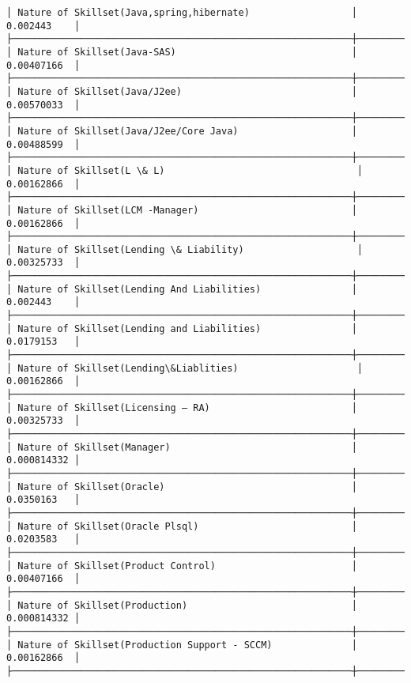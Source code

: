 \documentclass[11pt]{article}
\begin{document}
\begin{Verbatim}[commandchars=\\\{\}]
│ Nature of Skillset(Java,spring,hibernate)                  │ 0.002443    │
├────────────────────────────────────────────────────────────┼─────────────┤
│ Nature of Skillset(Java-SAS)                               │ 0.00407166  │
├────────────────────────────────────────────────────────────┼─────────────┤
│ Nature of Skillset(Java/J2ee)                              │ 0.00570033  │
├────────────────────────────────────────────────────────────┼─────────────┤
│ Nature of Skillset(Java/J2ee/Core Java)                    │ 0.00488599  │
├────────────────────────────────────────────────────────────┼─────────────┤
│ Nature of Skillset(L \& L)                                  │ 0.00162866  │
├────────────────────────────────────────────────────────────┼─────────────┤
│ Nature of Skillset(LCM -Manager)                           │ 0.00162866  │
├────────────────────────────────────────────────────────────┼─────────────┤
│ Nature of Skillset(Lending \& Liability)                    │ 0.00325733  │
├────────────────────────────────────────────────────────────┼─────────────┤
│ Nature of Skillset(Lending And Liabilities)                │ 0.002443    │
├────────────────────────────────────────────────────────────┼─────────────┤
│ Nature of Skillset(Lending and Liabilities)                │ 0.0179153   │
├────────────────────────────────────────────────────────────┼─────────────┤
│ Nature of Skillset(Lending\&Liablities)                     │ 0.00162866  │
├────────────────────────────────────────────────────────────┼─────────────┤
│ Nature of Skillset(Licensing – RA)                         │ 0.00325733  │
├────────────────────────────────────────────────────────────┼─────────────┤
│ Nature of Skillset(Manager)                                │ 0.000814332 │
├────────────────────────────────────────────────────────────┼─────────────┤
│ Nature of Skillset(Oracle)                                 │ 0.0350163   │
├────────────────────────────────────────────────────────────┼─────────────┤
│ Nature of Skillset(Oracle Plsql)                           │ 0.0203583   │
├────────────────────────────────────────────────────────────┼─────────────┤
│ Nature of Skillset(Product Control)                        │ 0.00407166  │
├────────────────────────────────────────────────────────────┼─────────────┤
│ Nature of Skillset(Production)                             │ 0.000814332 │
├────────────────────────────────────────────────────────────┼─────────────┤
│ Nature of Skillset(Production Support - SCCM)              │ 0.00162866  │
├────────────────────────────────────────────────────────────┼─────────────┤

\end{Verbatim}
\end{document}
